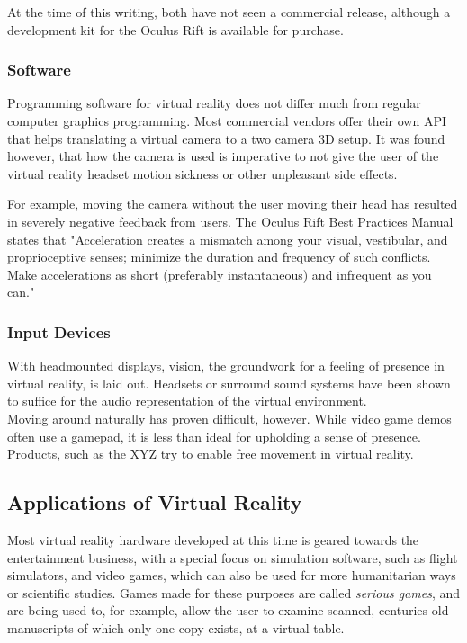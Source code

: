\documentclass[11pt]{article}
\begin{document}
	
	At the time of this writing, both have not seen a commercial release, although a development kit for the Oculus Rift is available for purchase.

	\subsubsection{Software}
		Programming software for virtual reality does not differ much from regular computer graphics programming. Most commercial vendors offer their own API that helps translating a virtual camera to a two camera 3D setup. It was found however, that how the camera is used is imperative to not give the user of the virtual reality headset motion sickness or other unpleasant side effects. \cite{seppanen14}
		
		
		For example, moving the camera without the user moving their head has resulted in severely negative feedback from users. The Oculus Rift Best Practices Manual states that "Acceleration creates a mismatch among your visual, vestibular, and proprioceptive senses; minimize the duration and frequency of such conflicts. Make accelerations as short (preferably instantaneous) and infrequent as you can." \cite{yao2014oculus}
	
	\subsubsection{Input Devices}
	With headmounted displays, vision, the groundwork for a feeling of presence in virtual reality, is laid out. Headsets or surround sound systems have been shown to suffice for the audio representation of the virtual environment.\\
	Moving around naturally has proven difficult, however. While video game demos often use a gamepad, it is less than ideal for upholding a sense of presence. Products, such as the XYZ try to enable free movement in virtual reality.
	
	\subsection{Applications of Virtual Reality}
	Most virtual reality hardware developed at this time is geared towards the entertainment business, with a special focus on simulation software, such as flight simulators, and video games, %
	which can also be used for more humanitarian ways or scientific studies. Games made for these purposes are called \emph{serious games}, and are being used to, for example, allow the user to examine scanned, centuries old manuscripts of which only one copy exists, at a virtual table. \cite{lorenzini2013serious}
	
\end{document}

